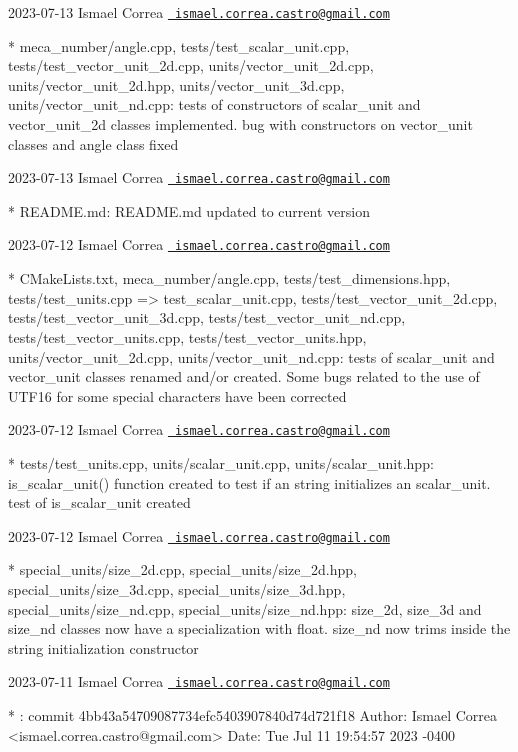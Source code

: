  2023-\/07-\/13 Ismael Correa \href{mailto:ismael.correa.castro@gmail.com}{\texttt{ ismael.\+correa.\+castro@gmail.\+com}} \begin{DoxyVerb}* meca_number/angle.cpp, tests/test_scalar_unit.cpp,
tests/test_vector_unit_2d.cpp, units/vector_unit_2d.cpp,
units/vector_unit_2d.hpp, units/vector_unit_3d.cpp,
units/vector_unit_nd.cpp: tests of constructors of scalar_unit and
vector_unit_2d classes implemented. bug with constructors on
vector_unit classes and angle class fixed
\end{DoxyVerb}
 2023-\/07-\/13 Ismael Correa \href{mailto:ismael.correa.castro@gmail.com}{\texttt{ ismael.\+correa.\+castro@gmail.\+com}} \begin{DoxyVerb}* README.md: README.md updated to current version
\end{DoxyVerb}
 2023-\/07-\/12 Ismael Correa \href{mailto:ismael.correa.castro@gmail.com}{\texttt{ ismael.\+correa.\+castro@gmail.\+com}} \begin{DoxyVerb}* CMakeLists.txt, meca_number/angle.cpp, tests/test_dimensions.hpp,
tests/{test_units.cpp => test_scalar_unit.cpp},
tests/test_vector_unit_2d.cpp, tests/test_vector_unit_3d.cpp,
tests/test_vector_unit_nd.cpp, tests/test_vector_units.cpp,
tests/test_vector_units.hpp, units/vector_unit_2d.cpp,
units/vector_unit_nd.cpp: tests of scalar_unit and vector_unit
classes renamed and/or created. Some bugs related to the use of
UTF16 for some special characters have been corrected
\end{DoxyVerb}
 2023-\/07-\/12 Ismael Correa \href{mailto:ismael.correa.castro@gmail.com}{\texttt{ ismael.\+correa.\+castro@gmail.\+com}} \begin{DoxyVerb}* tests/test_units.cpp, units/scalar_unit.cpp,
units/scalar_unit.hpp: is_scalar_unit() function created to test if
an string initializes an scalar_unit. test of is_scalar_unit created
\end{DoxyVerb}
 2023-\/07-\/12 Ismael Correa \href{mailto:ismael.correa.castro@gmail.com}{\texttt{ ismael.\+correa.\+castro@gmail.\+com}} \begin{DoxyVerb}* special_units/size_2d.cpp, special_units/size_2d.hpp,
special_units/size_3d.cpp, special_units/size_3d.hpp,
special_units/size_nd.cpp, special_units/size_nd.hpp: size_2d,
size_3d and size_nd classes now have a specialization with float.
size_nd now trims inside the string initialization constructor
\end{DoxyVerb}
 2023-\/07-\/11 Ismael Correa \href{mailto:ismael.correa.castro@gmail.com}{\texttt{ ismael.\+correa.\+castro@gmail.\+com}} \begin{DoxyVerb}* : commit 4bb43a54709087734efc5403907840d74d721f18 Author: Ismael
Correa <ismael.correa.castro@gmail.com> Date:   Tue Jul 11 19:54:57
2023 -0400
\end{DoxyVerb}
